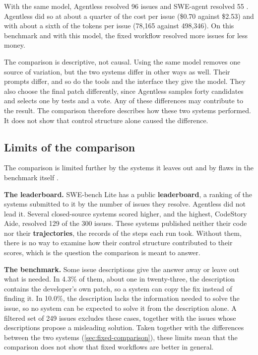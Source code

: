 With the same model, Agentless resolved 96 issues and SWE-agent resolved 55
\citep[Table~1]{xia2025agentless}. Agentless did so at about a quarter of the cost per issue
(\$0.70 against \$2.53) and with about a sixth of the tokens per issue (78,165 against 498,346). On
this benchmark and with this model, the fixed workflow resolved more issues for less money.

The comparison is descriptive, not causal. Using the same model removes one source of variation,
but the two systems differ in other ways as well. Their prompts differ, and so do the tools and the
interface they give the model. They also choose the final patch differently, since Agentless
samples forty candidates and selects one by tests and a vote. Any of these differences may
contribute to the result. The comparison therefore describes how these two systems performed. It
does not show that control structure alone caused the difference.

\subsection{Limits of the comparison}
\label{sec:fixed-salt}

The comparison is limited further by the systems it leaves out and by flaws in the benchmark itself
\citep[Table~1 and \S\S6.1--6.2]{xia2025agentless}.
\bi
\item \textbf{The leaderboard.} SWE-bench Lite has a public \textbf{leaderboard}, a ranking of the
systems submitted to it by the number of issues they resolve. Agentless did not lead it. Several
closed-source systems scored higher, and the highest, CodeStory Aide, resolved 129 of the 300
issues. These systems published neither their code nor their \textbf{trajectories}, the records of
the steps each run took. Without them, there is no way to examine how their control structure
contributed to their scores, which is the question the comparison is meant to answer.
\item \textbf{The benchmark.} Some issue descriptions give the answer away or leave out what is
needed. In 4.3\% of them, about one in twenty-three, the description contains the developer's own
patch, so a system can copy the fix instead of finding it. In 10.0\%, the description lacks the
information needed to solve the issue, so no system can be expected to solve it from the
description alone. A filtered set of 249 issues excludes these cases, together with the issues
whose descriptions propose a misleading solution.
\ei
Taken together with the differences between the two systems (\cref{sec:fixed-comparison}), these
limits mean that the comparison does not show that fixed workflows are better in general.

